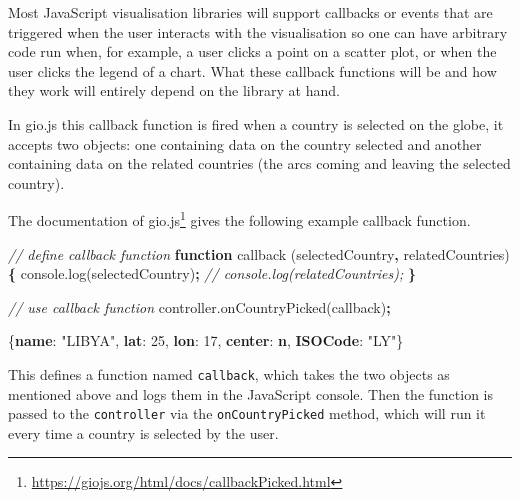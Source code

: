 \documentclass[10pt,]{krantz}
\makeatletter
\newenvironment{Shaded}{\begin{snugshade}}{\end{snugshade}}
\newcommand{\AttributeTok}[1]{\textcolor[rgb]{0.61,0.61,0.61}{#1}}
\newcommand{\CommentTok}[1]{\textcolor[rgb]{0.37,0.37,0.37}{\textit{#1}}}
\newcommand{\DecValTok}[1]{\textcolor[rgb]{0.06,0.06,0.06}{#1}}
\newcommand{\ErrorTok}[1]{\textcolor[rgb]{0.14,0.14,0.14}{\textbf{#1}}}
\newcommand{\FunctionTok}[1]{\textcolor[rgb]{0,0,0}{#1}}
\newcommand{\KeywordTok}[1]{\textcolor[rgb]{0.27,0.27,0.27}{\textbf{#1}}}
\newcommand{\NormalTok}[1]{#1}
\newcommand{\OperatorTok}[1]{\textcolor[rgb]{0.43,0.43,0.43}{\textbf{#1}}}
\newcommand{\StringTok}[1]{\textcolor[rgb]{0.5,0.5,0.5}{#1}}
\newcommand{\VariableTok}[1]{\textcolor[rgb]{0,0,0}{#1}}
\renewcommand{\href}[2]{#2\footnote{\url{#1}}}
\newenvironment{kframe}{%
\medskip{}
\setlength{\fboxsep}{.8em}
 \def\at@end@of@kframe{}%
 \ifinner\ifhmode%
  \def\at@end@of@kframe{\end{minipage}}%
  \begin{minipage}{\columnwidth}%
 \fi\fi%
 \def\FrameCommand##1{\hskip\@totalleftmargin \hskip-\fboxsep
 \colorbox{shadecolor}{##1}\hskip-\fboxsep
     \hskip-\linewidth \hskip-\@totalleftmargin \hskip\columnwidth}%
 \MakeFramed {\advance\hsize-\width
   \@totalleftmargin\z@ \linewidth\hsize
   \@setminipage}}%
 {\par\unskip\endMakeFramed%
 \at@end@of@kframe}
\renewenvironment{Shaded}{\begin{kframe}}{\end{kframe}}
\makeatother
\begin{document}
Most JavaScript visualisation libraries will support callbacks or events that are triggered when the user interacts with the visualisation so one can have arbitrary code run when, for example, a user clicks a point on a scatter plot, or when the user clicks the legend of a chart. What these callback functions will be and how they work will entirely depend on the library at hand.

In gio.js this callback function is fired when a country is selected on the globe, it accepts two objects: one containing data on the country selected and another containing data on the related countries (the arcs coming and leaving the selected country).

The \href{https://giojs.org/html/docs/callbackPicked.html}{documentation of gio.js} gives the following example callback function.

\begin{Shaded}
\begin{Highlighting}[]
\CommentTok{// define callback function}
\KeywordTok{function} \AttributeTok{callback}\NormalTok{ (selectedCountry}\OperatorTok{,}\NormalTok{ relatedCountries) }\OperatorTok{\{}
  \VariableTok{console}\NormalTok{.}\AttributeTok{log}\NormalTok{(selectedCountry)}\OperatorTok{;}
  \CommentTok{// console.log(relatedCountries);}
\OperatorTok{\}}

\CommentTok{// use callback function}
\VariableTok{controller}\NormalTok{.}\AttributeTok{onCountryPicked}\NormalTok{(callback)}\OperatorTok{;}
\end{Highlighting}
\end{Shaded}

\begin{Shaded}
\begin{Highlighting}[]
\FunctionTok{\{}\ErrorTok{name}\FunctionTok{:} \StringTok{"LIBYA"}\FunctionTok{,} \ErrorTok{lat}\FunctionTok{:} \DecValTok{25}\FunctionTok{,} \ErrorTok{lon}\FunctionTok{:} \DecValTok{17}\FunctionTok{,} \ErrorTok{center}\FunctionTok{:} \ErrorTok{n}\FunctionTok{,} \ErrorTok{ISOCode}\FunctionTok{:} \StringTok{"LY"}\FunctionTok{\}}
\end{Highlighting}
\end{Shaded}

This defines a function named \texttt{callback}, which takes the two objects as mentioned above and logs them in the JavaScript console. Then the function is passed to the \texttt{controller} via the \texttt{onCountryPicked} method, which will run it every time a country is selected by the user.
\end{document}
